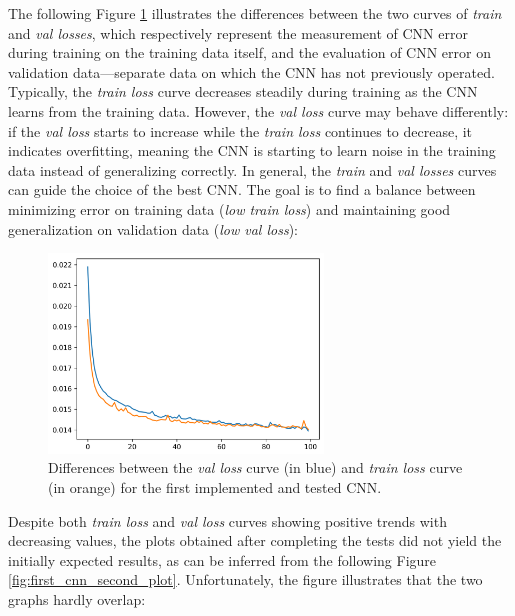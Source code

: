 \documentclass[12pt,english]{report}
\begin{document}
The following Figure \ref{fig:first_cnn_first_plot} illustrates the differences between the two curves of \textit{train} and \textit{val losses}, which respectively represent the measurement of CNN error during training on the training data itself, and the evaluation of CNN error on validation data—separate data on which the CNN has not previously operated. Typically, the \textit{train loss} curve decreases steadily during training as the CNN learns from the training data. However, the \textit{val loss} curve may behave differently: if the \textit{val loss} starts to increase while the \textit{train loss} continues to decrease, it indicates overfitting, meaning the CNN is starting to learn noise in the training data instead of generalizing correctly. In general, the \textit{train} and \textit{val losses} curves can guide the choice of the best CNN. The goal is to find a balance between minimizing error on training data (\textit{low train loss}) and maintaining good generalization on validation data (\textit{low val loss}):

\begin{figure}[H]
    \centering
    \includegraphics[width=0.65\textwidth]{images/first_cnn_first_plot.png}
    \captionsetup{justification=centering}
    \caption{Differences between the \textit{val loss} curve (in blue) and \textit{train loss} curve (in orange) for the first implemented and tested CNN.}
    \label{fig:first_cnn_first_plot}
\end{figure}

Despite both \textit{train loss} and \textit{val loss} curves showing positive trends with decreasing values, the plots obtained after completing the tests did not yield the initially expected results, as can be inferred from the following Figure \ref{fig:first_cnn_second_plot}. Unfortunately, the figure illustrates that the two graphs hardly overlap:
\end{document}
